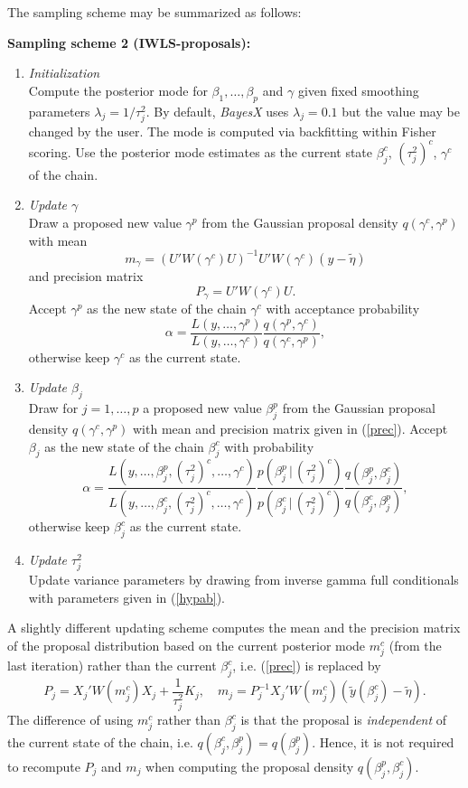 \documentclass[11pt,a4paper,twoside]{bayesxarticle}
\begin{document}
The sampling scheme may be summarized as follows:

{\bf Sampling scheme 2 (IWLS-proposals):}

\begin{enumerate}
\item {\em Initialization} \\
Compute the posterior mode for $\beta_1,\dots,\beta_p$ and
$\gamma$ given fixed smoothing parameters $\lambda_j =
1/\tau^2_j$. By default, {\em BayesX} uses $\lambda_j = 0.1$ but
the value may be changed by the user. The mode is computed via
backfitting within Fisher scoring. Use the posterior mode
estimates as the current state $\beta_j^c$, $(\tau_j^2)^c$,
$\gamma^c$ of the chain.
\item {\em Update $\gamma$} \\
Draw a proposed new value $\gamma^p$ from the Gaussian proposal
density $q(\gamma^c,\gamma^p)$ with mean
$$
m_{\gamma} = (U' W(\gamma^c) U)^{-1}U' W(\gamma^c) (y-\tilde{\eta}
)
$$
and precision matrix
$$
P_{\gamma} = U' W(\gamma^c) U.
$$
Accept $\gamma^p$ as the new state of the chain $\gamma^c$ with
acceptance probability
$$
\alpha = \frac{ L(y,\dots,\gamma^p)} {L(y,\dots,\gamma^c)} \frac{
q(\gamma^p,\gamma^c)}{q(\gamma^c,\gamma^p)},
$$
otherwise keep $\gamma^c$ as the current state.
\item {\em Update $\beta_j$} \\
Draw for $j=1,\dots,p$ a proposed new value $\beta_j^p$ from the
Gaussian proposal density $q(\gamma^c,\gamma^p)$ with mean and
precision matrix given in (\ref{prec}). Accept $\beta_j$ as the
new state of the chain $\beta_j^c$ with probability
$$
\alpha = \frac{
L(y,\dots,\beta^{p}_j,(\tau_j^2)^{c},\dots,\gamma^c)}
{L(y,\dots,\beta^{c}_j,(\tau_j^2)^{c},\dots,\gamma^c)}
\frac{p(\beta_j^p \, | \, (\tau_j^2)^c)}{p(\beta_j^c \, | \,
(\tau_j^2)^c)} \frac{
q(\beta_j^p,\beta_j^c)}{q(\beta_j^c,\beta_j^p)},
$$
otherwise keep $\beta_j^c$ as the current state.
\item {\em Update $\tau^2_j$} \\
Update variance parameters by drawing from inverse gamma full
conditionals with parameters given in (\ref{hypab}).
\end{enumerate}

A slightly different updating scheme computes the mean and the
precision matrix of the proposal distribution based on the current
posterior mode $m_j^c$ (from the last iteration) rather than the
current $\beta_j^c$, i.e. (\ref{prec}) is replaced by
\begin{equation}
\label{precmode} P_j = X_j'W(m_j^c)X_j + \frac{1}{\tau^2_j}K_j,
\quad m_j = P_j^{-1}X_j'W(m_j^c)(\tilde{y}(\beta^c_j) -
\tilde{\eta}).
\end{equation}
The difference of using $m_j^c$ rather than $\beta_j^c$ is that
the proposal is {\em independent} of the current state of the
chain, i.e. $q(\beta_j^c,\beta_j^p) = q(\beta_j^p)$. Hence, it is
not required to recompute $P_j$ and $m_j$ when computing the
proposal density $q(\beta_j^p,\beta_j^c)$.
\end{document}
